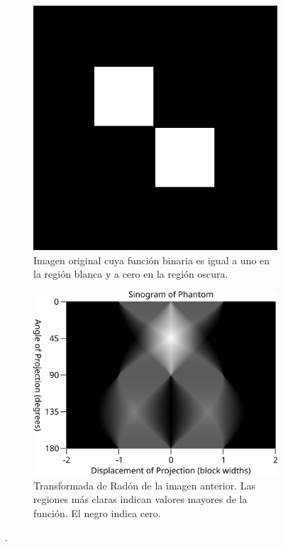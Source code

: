 \begin{figure}[!htbp]
    \centering
    \begin{subfigure}[b]{0.35\textwidth}
        \centering
        \includegraphics[width=\textwidth]{img/trans1.png}
        \caption{Imagen original cuya función binaria es igual a uno en la región blanca y a cero en la región oscura.}
        \label{fig:sinusoide_baja}
    \end{subfigure}
    \hfill
    \begin{subfigure}[b]{0.50\textwidth}
        \centering
        \includegraphics[width=\textwidth]{img/trans2.png}
        \caption{Transformada de Radón de la imagen anterior. Las regiones más claras indican valores mayores de la función. El negro indica cero.}
        \label{fig:sinusoide_alta}
    \end{subfigure}
    \caption{\cite{wikipediaRadon}.}
    \label{fig:trans}
\end{figure}

